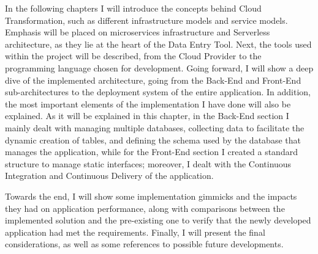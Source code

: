 In the following chapters I will introduce the concepts behind Cloud Transformation, such as different infrastructure models and service models. Emphasis will be placed on microservices infrastructure and Serverless architecture, as they lie at the heart of the Data Entry Tool. Next, the tools used within the project will be described, from the Cloud Provider to the programming language chosen for development. 
Going forward,  I will show a deep dive of the implemented architecture, going from the Back-End and Front-End sub-architectures to the deployment system of the entire application. In addition, the most important elements of the implementation I have done will also be explained. As it will be explained in this chapter, in the Back-End section I mainly dealt with managing multiple databases, collecting data to facilitate the dynamic creation of tables, and defining the schema used by the database that manages the application, while for the Front-End section I created a standard structure to manage static interfaces; moreover, I dealt with the Continuous Integration and Continuous Delivery of the application.

Towards the end, I will show some implementation gimmicks and the impacts they had on application performance, along with comparisons between the implemented solution and the pre-existing one to verify that the newly developed application had met the requirements. Finally, I will present the final considerations, as well as some references to possible future developments.

